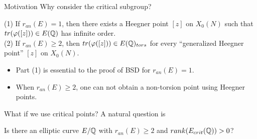 \documentclass[handout]{beamer}
\begin{document}
\begin{frame}{Motivation}
Why consider the critical subgroup? 


\pause

\begin{theorem}
(1) If $r_{an}(E) = 1$, then there exists a Heegner point $[z]$ on $X_0(N)$ such that  $tr(\varphi([z])) \in E(\mathbb{Q})$ has infinite order.  \\
(2) If $r_{an}(E) \geq 2$, then $tr(\varphi([z])) \in E(\mathbb{Q})_{tors}$ for every  ``generalized Heegner point'' $[z]$ on $X_0(N)$.
\end{theorem}

\pause

\begin{itemize}
\item Part (1) is essential to the proof of BSD  for $r_{an}(E) = 1$.
\item When $r_{an}(E) \geq 2$, one can not obtain a non-torsion point using Heegner points. 
\end{itemize}
\pause

What if we use critical points? A natural question is

\begin{question}
Is there an elliptic curve $E/\mathbb{Q}$ with $r_{an}(E) \geq 2$ and $rank(E_{crit}(\mathbb{Q})) >0$?
\end{question}


\end{frame}

\end{document}

